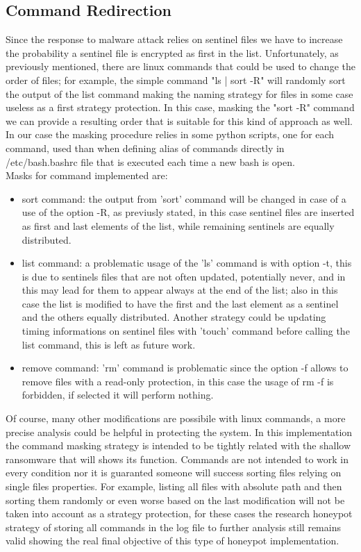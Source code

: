 \subsection{Command Redirection}
Since the response to malware attack relies on sentinel files we have to increase the probability a sentinel file is encrypted as first in the list. Unfortunately, as previously mentioned, there are linux commands that could be used to change the order of files; for example, the simple command "ls | sort -R" will randomly sort the output of the list command making the naming strategy for files in some case useless as a first strategy protection. In this case, masking the "sort -R" command we can provide a resulting order that is suitable for this kind of approach as well. In our case the masking procedure relies in some python scripts, one for each command, used than when defining alias of commands directly in /etc/bash.bashrc file that is executed each time a new bash is open.\\
Masks for command implemented are:
\begin{itemize}
  \item sort command: the output from 'sort' command will be changed in case of a use of the option -R, as previusly stated, in this case sentinel files are inserted as first and last elements of the list, while remaining sentinels are equally distributed.
  \item list command: a problematic usage of the 'ls' command is with option -t, this is due to sentinels files that are not often updated, potentially never, and in this may lead for them to appear always at the end of the list; also in this case the list is modified to have the first and the last element as a sentinel and the others equally distributed. Another strategy could be updating timing informations on sentinel files with 'touch' command before calling the list command, this is left as future work.
  \item remove command: 'rm' command is problematic since the option -f allows to remove files with a read-only protection, in this case the usage of rm -f is forbidden, if selected it will perform nothing.
\end{itemize}
Of course, many other modifications are possibile with linux commands, a more precise analysis could be helpful in protecting the system. In this implementation the command masking strategy is intended to be tightly related with the shallow ransomware that will shows its function. Commands are not intended to work in every condition nor it is guaranted someone will success sorting files relying on single files properties. For example, listing all files with absolute path and then sorting them randomly or even worse based on the last modification will not be taken into account as a strategy protection, for these cases the research honeypot strategy of storing all commands in the log file to further analysis still remains valid showing the real final objective of this type of honeypot implementation.

